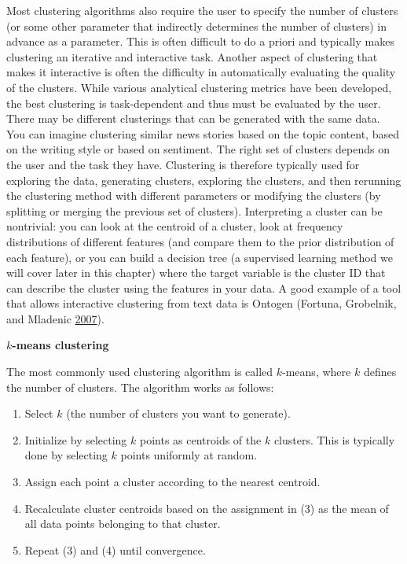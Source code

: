 \documentclass[]{krantz}
\begin{document}
Most clustering algorithms also require the user to specify the number
of clusters (or some other parameter that indirectly determines the
number of clusters) in advance as a parameter. This is often difficult
to do a priori and typically makes clustering an iterative and
interactive task. Another aspect of clustering that makes it interactive
is often the difficulty in automatically evaluating the quality of the
clusters. While various analytical clustering metrics have been
developed, the best clustering is task-dependent and thus must be
evaluated by the user. There may be different clusterings that can be
generated with the same data. You can imagine clustering similar news
stories based on the topic content, based on the writing style or based
on sentiment. The right set of clusters depends on the user and the task
they have. Clustering is therefore typically used for exploring the
data, generating clusters, exploring the clusters, and then rerunning
the clustering method with different parameters or modifying the
clusters (by splitting or merging the previous set of clusters).
Interpreting a cluster can be nontrivial: you can look at the centroid
of a cluster, look at frequency distributions of different features (and
compare them to the prior distribution of each feature), or you can
build a decision tree (a supervised learning method we will cover later
in this chapter) where the target variable is the cluster ID that can
describe the cluster using the features in your data. A good example of
a tool that allows interactive clustering from text data is Ontogen
(Fortuna, Grobelnik, and Mladenic
\protect\hyperlink{ref-Ontogen}{2007}).

\enlargethispage{6pt} \textbf{\(k\)-means clustering}

The most commonly used clustering algorithm is called \(k\)-means, where
\(k\) defines the number of clusters. The algorithm works as follows:

\begin{enumerate}
\def\labelenumi{\arabic{enumi}.}
\item
  Select \(k\) (the number of clusters you want to generate).
\item
  Initialize by selecting \(k\) points as centroids of the \(k\)
  clusters. This is typically done by selecting \(k\) points uniformly
  at random.
\item
  Assign each point a cluster according to the nearest centroid.
\item
  Recalculate cluster centroids based on the assignment in (3) as the
  mean of all data points belonging to that cluster.
\item
  Repeat (3) and (4) until convergence.
\end{enumerate}
\end{document}
